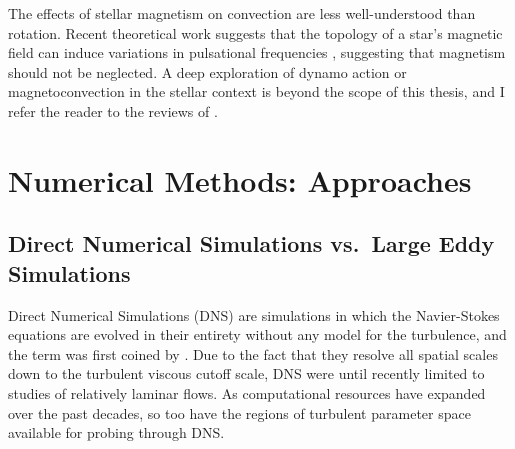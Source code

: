 The effects of stellar magnetism on convection are less well-understood than rotation.
Recent theoretical work suggests that the topology of a star's magnetic field can induce variations in pulsational frequencies \citep{santos&all2018}, suggesting that magnetism should not be neglected.
A deep exploration of dynamo action or magnetoconvection in the stellar context is beyond the scope of this thesis, and I refer the reader to the reviews of \citet{charbonneau2010, charbonneau2014, brun&browning2017}.



\section{Numerical Methods: Approaches}
\label{sct:numerics}

\subsection{Direct Numerical Simulations vs.~Large Eddy Simulations}
Direct Numerical Simulations (DNS) are simulations in which the Navier-Stokes equations are evolved in their entirety without any model for the turbulence, and the term was first coined by \citet{orzag1970}.
Due to the fact that they resolve all spatial scales down to the turbulent viscous cutoff scale, DNS were until recently limited to studies of relatively laminar flows.
As computational resources have expanded over the past decades, so too have the regions of turbulent parameter space available for probing through DNS.


